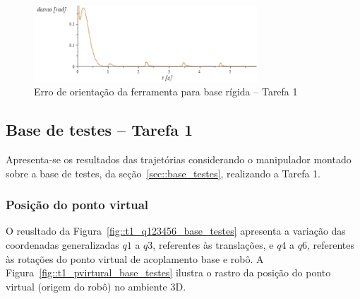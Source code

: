 \begin{figure}[h!]
	\centering 
 	\includegraphics[width=0.75\textwidth]{figs/t1_erroori_base_rig}
 	\caption{Erro de orientação da ferramenta para base rígida -- Tarefa
 	1}
 	\label{fig::t1_erroori_base_rig}
\end{figure}



\subsection{Base de testes -- Tarefa 1} \label{sec::res_testes}

Apresenta-se os resultados das trajetórias considerando o manipulador montado
sobre a base de testes, da seção~\ref{sec::base_testes}, realizando a Tarefa 1.

\subsubsection{Posição do ponto virtual}

O reusltado da Figura~\ref{fig::t1_q123456_base_testes} apresenta a variação das
coordenadas generalizadas $q1$ a $q3$, referentes às translações, e $q4$ a $q6$,
referentes às rotações do ponto virtual de acoplamento base e robô. A
Figura~\ref{fig::t1_pvirtural_base_testes} ilustra o rastro da posição do ponto
virtual (origem do robô) no ambiente 3D.

